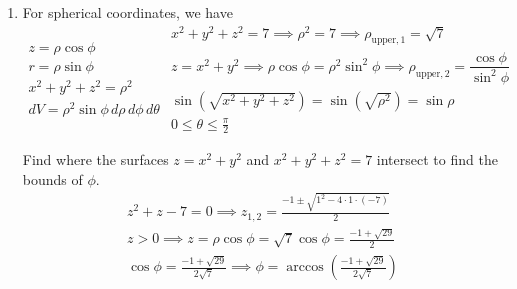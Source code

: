 \documentclass[a4paper, 12pt]{article}
\begin{document}
\begin{enumerate}[leftmargin=*,label=\textbf{\arabic*.}]
Find where the surfaces $z=r$ and $z=2-r^2$ intersect to determine the upper bound of $r$.
\begin{align*}\left.\begin{array}{c}
z=r\\
z=2-r^2
\end{array}\right\}\quad r^2+r-2=0\implies (r+2)(r-1)=0\implies r_{\text{upper}}=1\end{align*}

\begin{align*}{I}&=\int_0^{2\pi}\int_0^1\int_{r}^{2-r^2}r\,dz\,dr\,d\theta=\int_0^{2\pi}\int_0^1\bigg[z\bigg]_{z=r}^{z=2-r^2}r\,dr\,d\theta\\[1em]&=\int_0^{2\pi}\int_0^1\left(2-r^2-r\right)\,r\,dr\,d\theta=\int_0^{2\pi}\int_0^1\left(2r-r^3-r^2\right)\,dr\,d\theta\\[1em]&=\int_0^{2\pi}\left[r^2-\frac{r^4}4-\frac{r^3}3\right]_{r=0}^{r=1}\,d\theta=\int_0^{2\pi}\frac5{12}\,d\theta=\frac5{12}\cdot\theta\,\bigg|_0^{2\pi}=\boxed{\frac{5\pi}6}\end{align*}

\item For spherical coordinates, we have
\[
\left.\begin{array}{c}
z=\rho\cos\phi\\
r=\rho\sin\phi\\
x^2+y^2+z^2=\rho^2\\
dV=\rho^2\sin\phi\,d\rho\,d\phi\,d\theta
\end{array}\right.\begin{array}{c}
x^2+y^2+z^2=7\implies\rho^2=7\implies\rho_{\text{upper},1}=\sqrt7\\
z=x^2+y^2\implies\rho\cos\phi=\rho^2\sin^2\phi\implies\rho_{\text{upper},2}=\dfrac{\cos\phi}{\sin^2\phi}\\[1em]
\sin\left(\sqrt{x^2+y^2+z^2}\right)=\sin\left(\sqrt{\rho^2}\right)=\sin\rho\\[1em]
\displaystyle0\leq\theta\leq\frac\pi2
\end{array}\]

Find where the surfaces $z=x^2+y^2$ and $x^2+y^2+z^2=7$ intersect to find the bounds of $\phi$.
\[\begin{array}{c}\displaystyle z^2+z-7=0\implies z_{1,2}=\frac{-1\pm\sqrt{1^2-4\cdot1\cdot(-7)}}2\\[1em]\displaystyle z>0\implies z=\rho\cos\phi=\sqrt7\cos\phi=\frac{-1+\sqrt{29}}{2}\\[1em]\displaystyle\cos\phi=\frac{-1+\sqrt{29}}{2\sqrt7}\implies\phi=\arccos\left(\frac{-1+\sqrt{29}}{2\sqrt7}\right)\end{array}\]


\end{enumerate}
\end{document}
